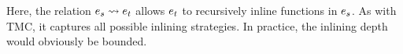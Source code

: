 Here, the relation $\datalangExpr_s \rightsquigarrow \datalangExpr_t$ allows $\datalangExpr_t$ to recursively inline functions in $\datalangExpr_s$.
As with TMC, it captures all possible inlining strategies.
In practice, the inlining depth would obviously be bounded.


